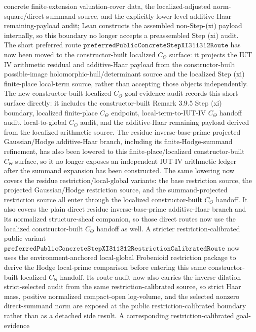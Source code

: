\documentclass[11pt]{article}
\theoremstyle{plain}
\theoremstyle{definition}
\theoremstyle{remark}
\begin{document}
concrete finite-extension valuation-cover data, the localized-adjusted
norm-square/direct-summand source, and the explicitly lower-level
additive-Haar remaining-payload audit; Lean constructs the assembled
non-Step-(xi) payload internally, so this boundary no longer accepts a
preassembled Step (xi) audit.  The short preferred route
\(\texttt{preferredPublicConcreteStepXI311312Route}\) has now been moved to the
constructor-built localized \(C_\Theta\) surface: it projects the IUT IV
arithmetic residual and additive-Haar payload from the constructor-built
possible-image holomorphic-hull/determinant source and the localized Step (xi)
finite-place local-term source, rather than accepting those objects
independently.  The new constructor-built localized \(C_\Theta\) goal-evidence
audit records this short surface directly: it includes the constructor-built
Remark 3.9.5 Step (xi) boundary, localized finite-place \(C_\Theta\) endpoint,
local-term-to-IUT-IV \(C_\Theta\) handoff audit, local-to-global \(C_\Theta\)
audit, and the additive-Haar remaining payload derived from the localized
  arithmetic source.  The residue inverse-base-prime projected
Gaussian/Hodge additive-Haar branch, including its finite-Hodge-summand
refinement, has also been lowered to this finite-place/localized
constructor-built \(C_\Theta\) surface, so it no longer exposes an independent
IUT-IV arithmetic ledger after the summand expansion has been constructed.
The same lowering now covers the residue restriction/local-global variants:
the base restriction source, the projected Gaussian/Hodge restriction source,
and the summand-projected restriction source all enter through the localized
constructor-built \(C_\Theta\) handoff.  It also covers the plain direct
residue inverse-base-prime additive-Haar branch and its normalized
structure-sheaf companion, so those direct routes now use the localized
constructor-built \(C_\Theta\) handoff as well.  A stricter
restriction-calibrated public variant
  \(\texttt{preferredPublicConcreteStepXI311312RestrictionCalibratedRoute}\)
  now uses the environment-anchored local-global Frobenioid restriction package
  to derive the Hodge local-prime comparison before entering this same
  constructor-built localized \(C_\Theta\) handoff.  Its route audit now also
  carries the inverse-dilation strict-selected audit from the same
  restriction-calibrated source, so strict Haar mass, positive normalized
  compact-open log-volume, and the selected nonzero direct-summand norm are
  exposed at the public restriction-calibrated boundary rather than as a
  detached side result.  A corresponding restriction-calibrated goal-evidence
\end{document}
